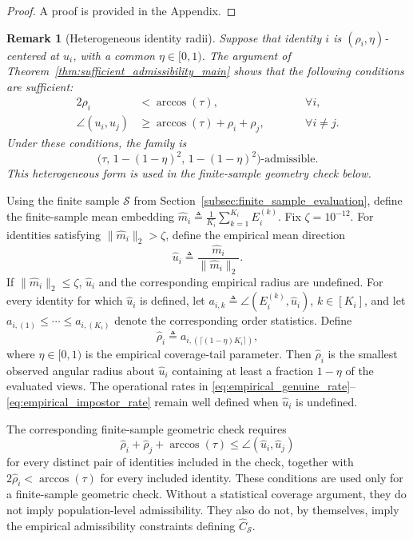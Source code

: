 \documentclass[journal]{IEEEtran}
\newtheorem{remark}[theorem]{Remark}
\begin{document}
\begin{bibunit}
\begin{proof}
A proof is provided in the Appendix.
\end{proof}


\begin{remark}[Heterogeneous identity radii]
%
Suppose that identity $i$ is $(\rho_i,\eta)$-centered at $u_i$, with a common $\eta\in[0,1)$. The argument of Theorem~\ref{thm:sufficient_admissibility_main} shows that the following conditions are sufficient:
%
\begin{align}
2\rho_i &<\arccos(\tau), \qquad &&\forall i,\\
\angle(u_i,u_j) &\ge\arccos(\tau)+\rho_i+\rho_j,
\qquad &&\forall i\ne j.
\end{align}
%
Under these conditions, the family is
\[
\bigl( \tau,\, 1-(1-\eta)^2,\, 1-(1-\eta)^2
\bigr)\text{-admissible}.
\]
This heterogeneous form is used in the finite-sample geometry check below.
%
\end{remark}



Using the finite sample $\mathcal S$ from Section~\ref{subsec:finite_sample_evaluation}, define the finite-sample mean embedding $\widehat m_i \triangleq \frac{1}{K_i}\sum_{k=1}^{K_i}E_i^{(k)}$. Fix $\zeta=10^{-12}$. For identities satisfying $\|\widehat m_i\|_2>\zeta$, define the empirical mean direction
%
\begin{equation}
\widehat u_i \triangleq \frac{\widehat m_i}{\|\widehat m_i\|_2}.
\label{eq:empirical_mean_direction_main}
\end{equation}
%
If $\|\widehat m_i\|_2\le\zeta$, $\widehat u_i$ and the corresponding empirical radius are undefined. For every identity for which $\widehat u_i$ is defined, let $a_{i,k} \triangleq \angle(E_i^{(k)},\widehat u_i)$, $k\in[K_i]$, and let $a_{i,(1)}\le\cdots\le a_{i,(K_i)}$ denote the corresponding order statistics. Define
%
\begin{equation}
\widehat\rho_i \triangleq a_{i,(\lceil(1-\eta)K_i\rceil)},
\label{eq:empirical_radius_main}
\end{equation}
%
where $\eta\in[0,1)$ is the empirical coverage-tail parameter. Then $\widehat\rho_i$ is the smallest observed angular radius about $\widehat u_i$ containing at least a fraction $1-\eta$ of the evaluated views. The operational rates in \eqref{eq:empirical_genuine_rate}--\eqref{eq:empirical_impostor_rate} remain well defined when $\widehat u_i$ is undefined.


The corresponding finite-sample geometric check requires
%
\begin{equation}
\widehat\rho_i+\widehat\rho_j+\arccos(\tau) \le \angle(\widehat u_i,\widehat u_j)
\label{eq:heterogeneous_empirical_sufficient}
\end{equation}
%
for every distinct pair of identities included in the check, together with $2\widehat\rho_i<\arccos(\tau)$ for every included identity. These conditions are used only for a finite-sample geometric check. Without a statistical coverage argument, they do not imply population-level admissibility. They also do not, by themselves, imply the empirical admissibility constraints defining $\widehat C_{\mathcal S}$.



\end{bibunit}
\end{document}
